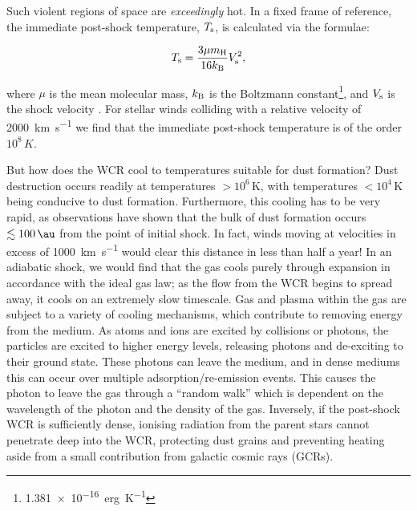 Such violent regions of space are \emph{exceedingly} hot.
In a fixed frame of reference, the immediate post-shock temperature, $T_\text{s}$, is calculated via the formulae:

\begin{equation}
  T_\text{s} = \frac{3\mu m_\text{H}}{16 k_\text{B}} V_\text{s}^2 ,
\end{equation}

\noindent
where $\mu$ is the mean molecular mass, $k_\text{B}$ is the Boltzmann constant\footnote{\SI{1.381e-16}{erg.K^{-1}}}, and $V_\text{s}$ is the shock velocity
\parencite[Ch.~9]{macielHydrodynamicsStellarWinds2014}.
For stellar winds colliding with a relative velocity of \SI{2000}{\kilo\metre\per\second} we find that the immediate post-shock temperature is of the order $10^8\,\si{K}$.

But how does the WCR cool to temperatures suitable for dust formation?
Dust destruction occurs readily at temperatures $>10^6\, \si{\kelvin}$, with temperatures $<10^4\,\si{\kelvin}$ being conducive to dust formation.
Furthermore, this cooling has to be very rapid, as observations have shown that the bulk of dust formation occurs $\lesssim \SI{100}{\au}$ from the point of initial shock.
In fact, winds moving at velocities in excess of \SI{1000}{\kilo\metre\per\second} would clear this distance in less than half a year!
In an adiabatic shock, we would find that the gas cools purely through expansion in accordance with the ideal gas law; as the flow from the WCR begins to spread away, it cools on an extremely slow timescale.
Gas and plasma within the gas are subject to a variety of cooling mechanisms, which contribute to removing energy from the medium.
As atoms and ions are excited by collisions or photons, the particles are excited to higher energy levels, releasing photons and de-exciting to their ground state.
These photons can leave the medium, and in dense mediums this can occur over multiple adsorption/re-emission events.
This causes the photon to leave the gas through a ``random walk'' which is dependent on the wavelength of the photon and the density of the gas.
Inversely, if the post-shock WCR is sufficiently dense, ionising radiation from the parent stars cannot penetrate deep into the WCR, protecting dust grains and preventing heating aside from a small contribution from galactic cosmic rays (GCRs).

